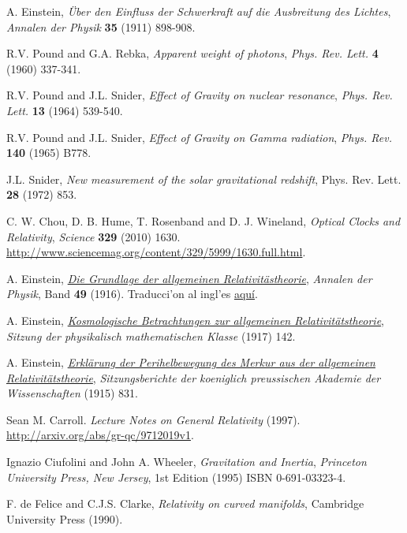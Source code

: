 \begin{thebibliography}{99}
 A. Einstein, {\it \"Uber den Einfluss der Schwerkraft auf die Ausbreitung des Lichtes}, {\sl Annalen der Physik} {\bf 35} (1911) 898-908.

 R.V. Pound and G.A. Rebka, {\em Apparent weight of photons}, {\sl Phys. Rev. Lett.} {\bf 4} (1960) 337-341.

 R.V. Pound and J.L. Snider, {\em Effect of Gravity on nuclear resonance}, {\sl Phys. Rev. Lett.} {\bf 13} (1964) 539-540.

 R.V. Pound and J.L. Snider, {\em Effect of Gravity on Gamma radiation}, {\sl Phys. Rev.} {\bf 140} (1965) B778.

 J.L. Snider, {\em New measurement of the solar gravitational redshift}, {\rm Phys. Rev. Lett.} {\bf 28} (1972) 853.

 C. W. Chou, D. B. Hume, T. Rosenband and D. J. Wineland, {\em Optical Clocks and Relativity}, {\sl Science} {\bf 329} (2010) 1630. \url{http://www.sciencemag.org/content/329/5999/1630.full.html}.

 A. Einstein, \href{https://docs.google.com/open?id=0B4RSIcYW5V0HMWY1YzM2MjAtMmJhMy00NmQ5LWFhMjEtNjdlODhhNjcxZTFk}{\it Die Grundlage der allgemeinen Relativitästheorie}, {\sl Annalen der Physik}, Band {\bf 49} (1916). Traducci'on al ingl'es \href{http://goo.gl/E2YFn}{aqu\'i}.

 A. Einstein, \href{https://goo.gl/A8miy}{\it Kosmologische Betrachtungen zur allgemeinen Relativitätstheorie}, {\sl Sitzung der physikalisch mathematischen Klasse} (1917) 142.

 A. Einstein, \href{https://docs.google.com/open?id=0B4RSIcYW5V0Hd0haajhUS0tRems}{\it Erkl\"arung der Perihelbewegung des Merkur aus der allgemeinen Relativit\"atstheorie}, {\sl Sitzungsberichte der koeniglich preussischen Akademie der Wissenschaften} (1915) 831.



 Sean M. Carroll. {\it Lecture Notes on General Relativity} (1997). \url{http://arxiv.org/abs/gr-qc/9712019v1}.

 Ignazio Ciufolini and John A. Wheeler, {\it Gravitation and Inertia},
{\sl Princeton University Press, New Jersey}, 1st Edition (1995) ISBN 0-691-03323-4.

 F. de Felice and C.J.S. Clarke, {\em Relativity on curved manifolds}, Cambridge University Press (1990).


\end{thebibliography}

